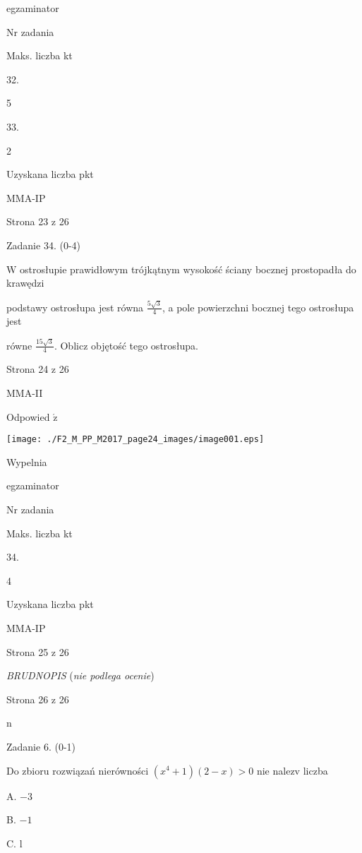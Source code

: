 \documentclass[a4paper,12pt]{article}
\begin{document}
egzaminator

Nr zadania

Maks. liczba kt

32.

5

33.

2

Uzyskana liczba pkt

MMA-IP

Strona 23 z 26





Zadanie 34. (0-4)

$\mathrm{W}$ ostrosłupie prawidłowym trójkątnym wysokość ściany bocznej prostopadła do krawędzi

podstawy ostrosłupa jest równa $\displaystyle \frac{5\sqrt{3}}{4}$, a pole powierzchni bocznej tego ostrosłupa jest

równe $\displaystyle \frac{15\sqrt{3}}{4}$. Oblicz objętość tego ostrosłupa.

Strona 24 z 26

MMA-II





Odpowied $\acute{\mathrm{z}}$
\begin{center}
\texttt{[image: ./F2\_M\_PP\_M2017\_page24\_images/image001.eps]}
\end{center}
Wypelnia

egzaminator

Nr zadania

Maks. liczba kt

34.

4

Uzyskana liczba pkt

MMA-IP

Strona 25 z 26





{\it BRUDNOPIS} ({\it nie podlega ocenie})

Strona 26 z 26

n





Zadanie 6. (0-1)

Do zbioru rozwiązań nierówności $(x^{4}+1)(2-x)>0$ nie nalez$\mathrm{v}$ liczba

A. $-3$

B. $-1$

C. l
\end{document}
